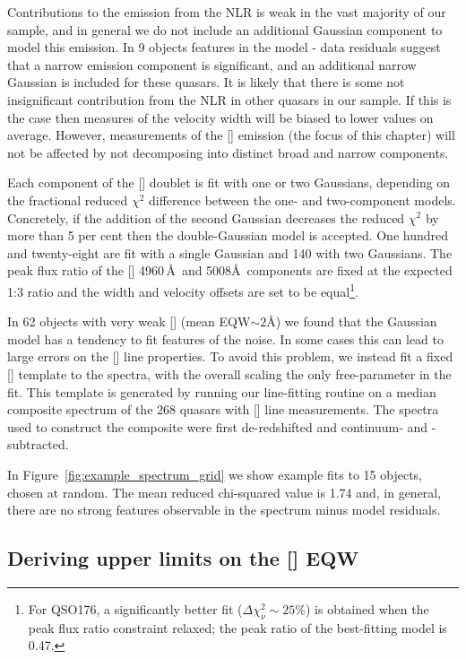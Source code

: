 Contributions to the \hb emission from the NLR is weak in the vast majority of our sample, and in general we do not include an additional Gaussian component to model this emission. 
In 9 objects features in the model - data residuals suggest that a narrow emission component is significant, and an additional narrow Gaussian is included for these quasars. 
It is likely that there is some not insignificant contribution from the NLR in other quasars in our sample. 
If this is the case then measures of the \hb velocity width will be biased to lower values on average. 
However, measurements of the [] emission (the focus of this chapter) will not be affected by not decomposing \hb into distinct broad and narrow components.  

Each component of the [] doublet is fit with one or two Gaussians, depending on the fractional reduced $\chi^2$ difference between the one- and two-component models. 
Concretely, if the addition of the second Gaussian decreases the reduced $\chi^2$ by more than 5 per cent then the double-Gaussian model is accepted.
One hundred and twenty-eight are fit with a single Gaussian and 140 with two Gaussians. 
The peak flux ratio of the [] 4960\,\AA\, and 5008\AA\, components are fixed at the expected 1:3 ratio and the width and velocity offsets are set to be equal\footnote{For QSO176, a significantly better fit ($\Delta \chi^2_{\nu} \sim 25\%$) is obtained when the peak flux ratio constraint relaxed; the peak ratio of the best-fitting model is 0.47.}.

In 62 objects with very weak [] (mean EQW$\sim2$\AA) we found that the Gaussian model has a tendency to fit features of the noise. 
In some cases this can lead to large errors on the [] line properties. 
To avoid this problem, we instead fit a fixed [] template to the spectra, with the overall scaling the only free-parameter in the fit.
This template is generated by running our line-fitting routine on a median composite spectrum of the 268 quasars with [] line measurements.  
The spectra used to construct the composite were first de-redshifted and continuum- and -subtracted.  

In Figure~\ref{fig:example_spectrum_grid} we show example fits to 15 objects, chosen at random. 
The mean reduced chi-squared value is 1.74 and, in general, there are no strong features observable in the spectrum minus model residuals.

\subsection{Deriving upper limits on the [] EQW}

